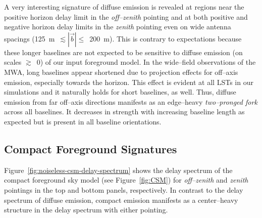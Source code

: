 \documentclass[preprint2,iop,numberedappendix]{emulateapj}
\begin{document}
A very interesting signature of diffuse emission is revealed at regions near the positive horizon delay limit in the {\it off--zenith} pointing and at both positive and negative horizon delay limits in the {\it zenith} pointing even on wide antenna spacings (125~m~$\lesssim |\vec{b}|\le$~200~m). This is contrary to expectations because these longer baselines are not expected to be sensitive to diffuse emission (on scales $\gtrsim$~0) of our input foreground model. In the wide--field observations of the MWA, long baselines appear shortened due to projection effects for off--axis emission, especially towards the horizon.  This effect is evident at all LSTs in our simulations and it naturally holds for short baselines, as well. Thus, diffuse emission from far off--axis directions manifests as an edge--heavy {\it two--pronged fork} across all baselines. It decreases in strength with increasing baseline length as expected but is present in all baseline orientations.   %

\subsection{Compact Foreground Signatures}\label{sec:compact}

Figure~\ref{fig:noiseless-csm-delay-spectrum} shows the delay spectrum of the compact foreground sky model (see Figure~\ref{fig:CSM}) for {\it off--zenith} and {\it zenith} pointings in the top and bottom panels, respectively. In contrast to the delay spectrum of diffuse emission, compact emission manifests as a center--heavy structure in the delay spectrum with either pointing. 
\end{document}
